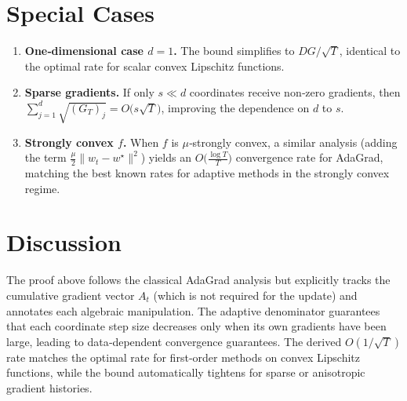 \documentclass{article}
\begin{document}
\section*{Special Cases}
\begin{enumerate}
\item \textbf{One‑dimensional case $d=1$.}
The bound simplifies to $DG/\sqrt{T}$, identical to the optimal rate
for scalar convex Lipschitz functions.

\item \textbf{Sparse gradients.}
If only $s\ll d$ coordinates receive non‑zero gradients,
then $\sum_{j=1}^{d}\sqrt{(G_T)_j}=O\bigl(s\sqrt{T}\bigr)$,
improving the dependence on $d$ to $s$.

\item \textbf{Strongly convex $f$.}
When $f$ is $\mu$‑strongly convex, a similar analysis (adding the term
$\frac{\mu}{2}\|w_t-w^\star\|^2$) yields an $O\bigl(\frac{\log T}{T}\bigr)$
convergence rate for AdaGrad, matching the best known rates for adaptive
methods in the strongly convex regime.
\end{enumerate}

\section*{Discussion}
The proof above follows the classical AdaGrad analysis but
explicitly tracks the cumulative gradient vector $A_t$ (which is not
required for the update) and annotates each algebraic manipulation.
The adaptive denominator guarantees that each coordinate step size
decreases only when its own gradients have been large, leading to
data‑dependent convergence guarantees.  The derived $O(1/\sqrt{T})$
rate matches the optimal rate for first‑order methods on convex
Lipschitz functions, while the bound automatically tightens for
sparse or anisotropic gradient histories.
\end{document}
